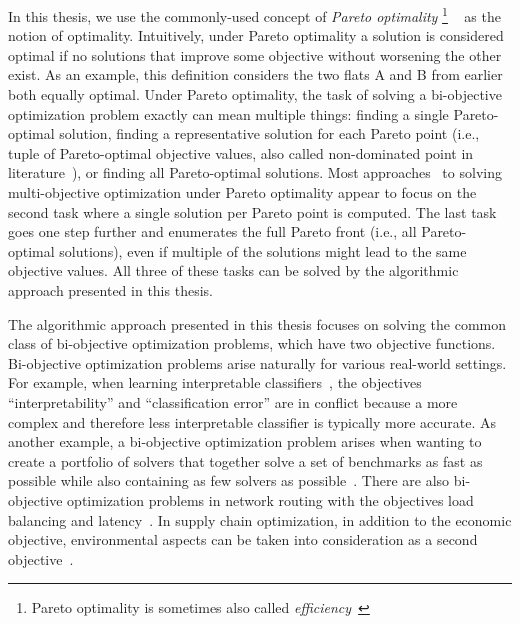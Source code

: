 In this thesis, we use the commonly-used concept of \emph{Pareto optimality}%
\footnote{Pareto optimality is sometimes also called \emph{efficiency}~\autocite{DBLP:journals/siamjo/SantisENR20}}%
~\autocite{Ehrgott2005-2} as the notion of optimality.
Intuitively, under Pareto optimality a solution is considered optimal if no solutions that improve some objective without worsening the other exist.
As an example, this definition considers the two flats A and B from earlier both equally optimal.
Under Pareto optimality, the task of solving a bi-objective optimization problem exactly can mean multiple things:
finding a single Pareto-optimal solution, finding a representative solution for each Pareto point (i.e., tuple of Pareto-optimal objective values, also called non-dominated point in literature~\autocite{Ehrgott2005-2}), or finding all Pareto-optimal solutions.
Most approaches~\autocite{DBLP:conf/cp/SohBTB17,DBLP:conf/cp/JanotaMSM21,DBLP:conf/ijcai/Terra-NevesLM18a} to solving multi-objective optimization under Pareto optimality appear to focus on the second task where a single solution per Pareto point is computed.
The last task goes one step further and enumerates the full Pareto front (i.e., all Pareto-optimal solutions), even if multiple of the solutions might lead to the same objective values.
All three of these tasks can be solved by the algorithmic approach presented in this thesis.

The algorithmic approach presented in this thesis focuses on solving the common class of bi-objective optimization problems, which have two objective functions.
Bi-objective optimization problems arise naturally for various real-world settings.
For example, when learning interpretable classifiers~\autocites{DBLP:conf/ijcai/Ignatiev0NS21,DBLP:conf/cp/MaliotovM18,DBLP:conf/ijcai/NarodytskaIPM18,DBLP:conf/ijcai/Hu0HH20,DBLP:journals/corr/abs-2010-09919,DBLP:conf/cp/YuISB20,DBLP:conf/aaai/Ignatiev0S021,DBLP:conf/cade/IgnatievPNM18}, the objectives ``interpretability'' and ``classification error'' are in conflict because a more complex and therefore less interpretable classifier is typically more accurate.
As another example, a bi-objective optimization problem arises when wanting to create a portfolio of solvers that together solve a set of benchmarks as fast as possible while also containing as few solvers as possible~\autocite{DBLP:conf/cp/JanotaMSM21}.
There are also bi-objective optimization problems in network routing with the objectives load balancing and latency~\autocite{SilverioEtAl2022biobjectiveoptimization}.
In supply chain optimization, in addition to the economic objective, environmental aspects can be taken into consideration as a second objective~\autocites{DBLP:journals/cce/Pinto-VarelaBN11,DBLP:journals/candie/TautenhainBN19}.

